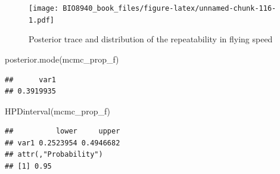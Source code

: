 \documentclass[
  12pt,
]{book}
\newenvironment{Shaded}{\begin{snugshade}}{\end{snugshade}}
\newcommand{\DecValTok}[1]{\textcolor[rgb]{0.00,0.00,0.81}{#1}}
\newcommand{\FunctionTok}[1]{\textcolor[rgb]{0.00,0.00,0.00}{#1}}
\newcommand{\NormalTok}[1]{#1}
\newcommand{\OtherTok}[1]{\textcolor[rgb]{0.56,0.35,0.01}{#1}}
\newcommand{\SpecialCharTok}[1]{\textcolor[rgb]{0.00,0.00,0.00}{#1}}
\begin{document}
\begin{Shaded}
\end{Shaded}

\begin{figure}
\centering
\texttt{[image: BIO8940\_book\_files/figure-latex/unnamed-chunk-116-1.pdf]}
\caption{\label{fig:unnamed-chunk-116}Posterior trace and distribution of the repeatability in flying speed}
\end{figure}

\begin{Shaded}
\begin{Highlighting}[]
\FunctionTok{posterior.mode}\NormalTok{(mcmc\_prop\_f)}
\end{Highlighting}
\end{Shaded}

\begin{verbatim}
##      var1 
## 0.3919935
\end{verbatim}

\begin{Shaded}
\begin{Highlighting}[]
\FunctionTok{HPDinterval}\NormalTok{(mcmc\_prop\_f)}
\end{Highlighting}
\end{Shaded}

\begin{verbatim}
##          lower     upper
## var1 0.2523954 0.4946682
## attr(,"Probability")
## [1] 0.95
\end{verbatim}

\begin{Shaded}
\end{Shaded}
\end{document}
